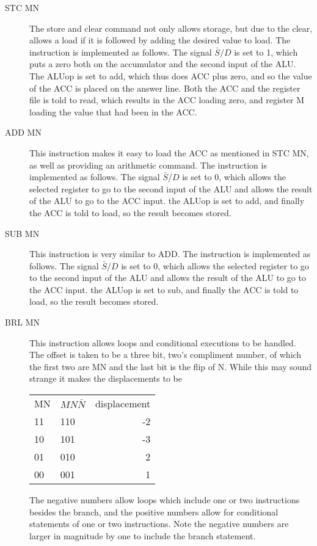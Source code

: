 \begin{description}
  \item[STC MN] The store and clear command not only allows storage, but due to the clear, allows a load if it is followed by adding the desired value to load.  The instruction is implemented as follows.  The signal $\bar S/D$ is set to 1, which puts a zero both on the accumulator and the second input of the ALU.  The ALUop is set to add, which thus does ACC plus zero, and so the value of the ACC is placed on the answer line.  Both the ACC and the register file is told to read, which results in the ACC loading zero, and register M loading the value that had been in the ACC.
  \item[ADD MN] This instruction makes it easy to load the ACC as mentioned in STC MN, as well as providing an arithmetic command.  The instruction is implemented as follows.  The signal $\bar S/D$ is set to 0, which allows the selected register to go to the second input of the ALU and allows the result of the ALU to go to the ACC input.  the ALUop is set to add, and finally the ACC is told to load, so the result becomes stored.
  \item[SUB MN] This instruction is very similar to ADD.  The instruction is implemented as follows.  The signal $\bar S/D$ is set to 0, which allows the selected register to go to the second input of the ALU and allows the result of the ALU to go to the ACC input.  the ALUop is set to sub, and finally the ACC is told to load, so the result becomes stored.
  \item[BRL MN] This instruction allows loops and conditional executions to be handled.  The offset is taken to be a three bit, two's compliment number, of which the first two are MN and the last bit is the flip of N.  While this may sound strange it makes the displacements to be

\begin{tabular}{llr}
MN & $MN\bar N$ & displacement \\
11 &  110       & -2 \\
10 &  101       & -3 \\
01 &  010       & 2 \\
00 &  001       & 1 \\
\end{tabular}

The negative numbers allow loops which include one or two instructions besides the branch, and the positive numbers allow for conditional statements of one or two instructions.  Note the negative numbers are larger in magnitude by one to include the branch statement.
\end{description}

